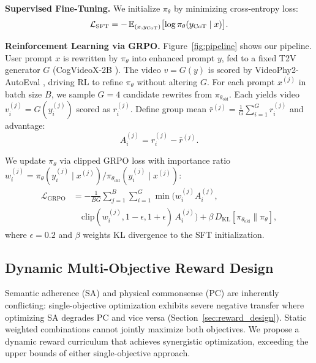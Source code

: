 \noindent\textbf{Supervised Fine-Tuning.} We initialize $\pi_{\theta}$ by minimizing cross-entropy loss:
\begin{equation}
  \mathcal{L}_{\text{SFT}}
  = -\operatorname{\mathbb{E}}_{(x,y_{\text{CoT}})} \bigl[\log \pi_{\theta}(y_{\text{CoT}} \mid x)\bigr].
\end{equation}

\noindent\textbf{Reinforcement Learning via GRPO.} Figure~\ref{fig:pipeline} shows our pipeline. User prompt $x$ is rewritten by $\pi_{\theta}$ into enhanced prompt $y$, fed to a fixed T2V generator $G$ (CogVideoX-2B \cite{yang2024cogvideox}). The video $v = G(y)$ is scored by VideoPhy2-AutoEval \cite{bansal2025videophy2}, driving RL to refine $\pi_{\theta}$ without altering $G$.
For each prompt $x^{(j)}$ in batch size $B$, we sample $G=4$ candidate rewrites from $\pi_{\theta_{\text{old}}}$. Each yields video $v_i^{(j)} = G(y_i^{(j)})$ scored as $r_i^{(j)}$. Define group mean $\bar r^{(j)} = \frac{1}{G}\sum_{i=1}^G r_i^{(j)}$ and advantage:
\begin{equation}
  A_i^{(j)} = r_i^{(j)} - \bar r^{(j)}.
  \label{eq:advantage}
\end{equation}

We update $\pi_\theta$ via clipped GRPO loss with importance ratio
$w_i^{(j)} = \pi_{\theta}(y_i^{(j)}\mid x^{(j)})/\pi_{\theta_{\text{old}}}(y_i^{(j)}\mid x^{(j)})$:
\begin{align}
  \mathcal{L}_{\text{GRPO}}
  &= -\frac{1}{BG}\sum_{j=1}^B\sum_{i=1}^G
    \min\bigl(
      w_i^{(j)} A_i^{(j)}, \nonumber \\
    &\quad \text{clip}(w_i^{(j)}, 1-\epsilon, 1+\epsilon)\,A_i^{(j)}
    \bigr)
    + \beta\,D_{\mathrm{KL}}[\pi_{\theta_{\text{old}}}\|\pi_{\theta}],
\end{align}
where $\epsilon=0.2$ and $\beta$ weights KL divergence to the SFT initialization.

\subsection{Dynamic Multi-Objective Reward Design}

Semantic adherence (SA) and physical commonsense (PC) are inherently conflicting: single-objective optimization exhibits severe negative transfer where optimizing SA degrades PC and vice versa (Section~\ref{sec:reward_design}). Static weighted combinations cannot jointly maximize both objectives. We propose a dynamic reward curriculum that achieves synergistic optimization, exceeding the upper bounds of either single-objective approach.

